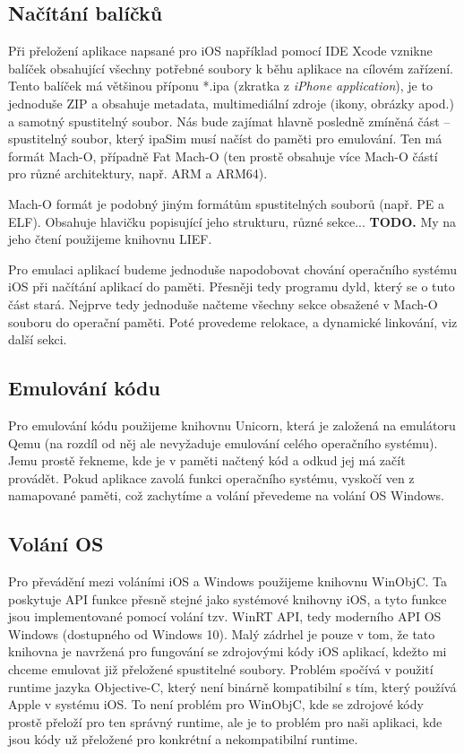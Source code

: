 \documentclass[12pt]{article}
\begin{document}
\subsection*{Načítání balíčků}

Při přeložení aplikace napsané pro iOS například pomocí IDE Xcode vznikne balíček obsahující všechny potřebné soubory k běhu aplikace na cílovém zařízení.
Tento balíček má většinou příponu *.ipa (zkratka z \textit{iPhone application}), je to jednoduše ZIP a obsahuje metadata, multimediální zdroje (ikony, obrázky apod.) a samotný spustitelný soubor.
Nás bude zajímat hlavně posledně zmíněná část -- spustitelný soubor, který ipaSim musí načíst do paměti pro emulování.
Ten má formát Mach-O, případně Fat Mach-O (ten prostě obsahuje více Mach-O částí pro různé architektury, např. ARM a ARM64).

Mach-O formát je podobný jiným formátům spustitelných souborů (např. PE a ELF).
Obsahuje hlavičku popisující jeho strukturu, různé sekce... \textbf{TODO.}
My na jeho čtení použijeme knihovnu LIEF.

Pro emulaci aplikací budeme jednoduše napodobovat chování operačního systému iOS při načítání aplikací do paměti.
Přesněji tedy programu dyld, který se o tuto část stará.
Nejprve tedy jednoduše načteme všechny sekce obsažené v Mach-O souboru do operační paměti.
Poté provedeme relokace, a dynamické linkování, viz další sekci.

\subsection*{Emulování kódu}

Pro emulování kódu použijeme knihovnu Unicorn, která je založená na emulátoru Qemu (na rozdíl od něj ale nevyžaduje emulování celého operačního systému).
Jemu prostě řekneme, kde je v paměti načtený kód a odkud jej má začít provádět.
Pokud aplikace zavolá funkci operačního systému, vyskočí ven z namapované paměti, což zachytíme a volání převedeme na volání OS Windows.

\subsection*{Volání OS}

Pro převádění mezi voláními iOS a Windows použijeme knihovnu WinObjC.
Ta poskytuje API funkce přesně stejné jako systémové knihovny iOS, a tyto funkce jsou implementované pomocí volání tzv. WinRT API, tedy moderního API OS Windows (dostupného od Windows 10).
Malý zádrhel je pouze v tom, že tato knihovna je navržená pro fungování se zdrojovými kódy iOS aplikací, kdežto mi chceme emulovat již přeložené spustitelné soubory.
Problém spočívá v použití runtime jazyka Objective-C, který není binárně kompatibilní s tím, který používá Apple v systému iOS.
To není problém pro WinObjC, kde se zdrojové kódy prostě přeloží pro ten správný runtime, ale je to problém pro naši aplikaci, kde jsou kódy už přeložené pro konkrétní a nekompatibilní runtime.
\end{document}
